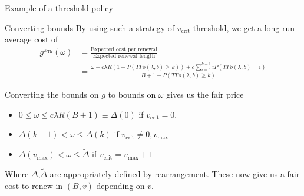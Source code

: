 \documentclass[10pt]{beamer}
\begin{document}
\begin{frame}{Example of a threshold policy}
\begin{myfigure}[H]
\begin{center}
{
}
\end{center}
\caption{Threshold policy, $\pi_{\text{Th}}(2)$, with \textcolor{blue}{$b_{j}=5$} and \textcolor{red}{$B_{j}=4$} (e.g. $X_{j} \leq 3.7$)}
\end{myfigure}
\end{frame}


\begin{frame}{Converting bounds}
By using such a strategy of $v_{\text{crit}}$ threshold, we get a long-run average cost of
\begin{align*}
g^{\pi_{\text{Th}}}(\omega)&=\frac{\text{Expected cost per renewal}}{\text{Expected renewal length}} \\
&= \frac{\omega + c \lambda R (1-P(TPo(\lambda,b) \geq k)) + c \sum\limits_{i=0}^{k-1} i P(TPo(\lambda,b)=i)}{B+1-P(TPo(\lambda,b) \geq k)}
\end{align*}

Converting the bounds on $g$ to bounds on $\omega$ gives us the fair price
\begin{itemize}
\item $0 \leq \omega \leq c \lambda R (B+1) \equiv \Delta(0)$ if $v_{\text{crit}}=0$.

\item $\Delta(k-1) < \omega \leq  \Delta(k)$ if $v_{\text{crit}} \neq 0,v_{\text{max}}$

\item $\Delta(v_{\text{max}}) < \omega \leq \widetilde{\Delta}$ if $v_{\text{crit}}=v_{\text{max}}+1$
\end{itemize}
Where $\Delta$,$\widetilde{\Delta}$ are appropriately defined by rearrangement.
These now give us a fair cost to renew in $(B,v)$ depending on $v$.
\end{frame}
\end{document}
